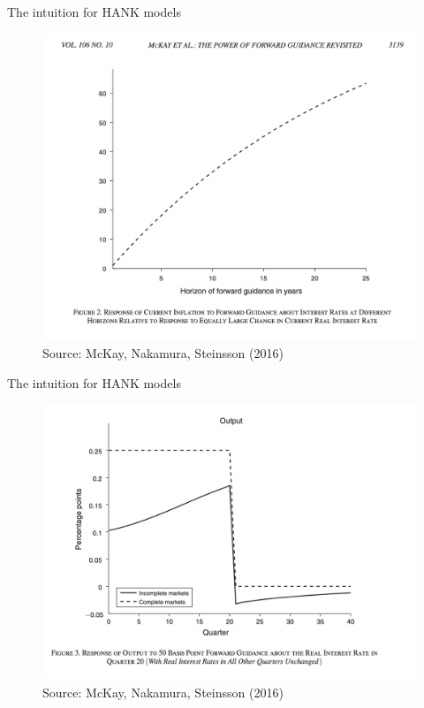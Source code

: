\documentclass[english,xcolor=svgnames]{beamer}
\begin{document}
\begin{frame}{The intuition for HANK models}
\begin{figure}
\includegraphics[scale=0.35]{figures/mns_3}\\
Source: McKay, Nakamura, Steinsson (2016)
\end{figure}
\end{frame}

\begin{frame}{The intuition for HANK models}
\begin{figure}
\includegraphics[scale=0.35]{figures/mns_1}\\
Source: McKay, Nakamura, Steinsson (2016)
\end{figure}
\end{frame}
\end{document}
